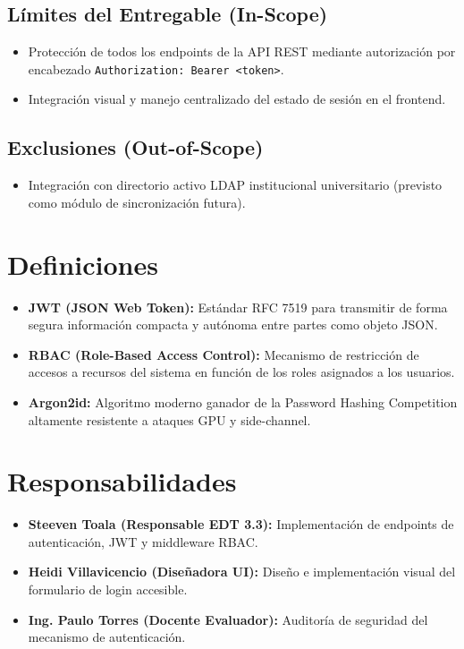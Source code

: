 \documentclass[12pt,a4paper]{article}
\begin{document}
\subsection{Límites del Entregable (In-Scope)}
\begin{itemize}[leftmargin=1.5em, itemsep=2pt]
    \item Protección de todos los endpoints de la API REST mediante autorización por encabezado \texttt{Authorization: Bearer <token>}.
    \item Integración visual y manejo centralizado del estado de sesión en el frontend.
\end{itemize}
\subsection{Exclusiones (Out-of-Scope)}
\begin{itemize}[leftmargin=1.5em, itemsep=2pt]
    \item Integración con directorio activo LDAP institucional universitario (previsto como módulo de sincronización futura).
\end{itemize}

\section{Definiciones}
\begin{itemize}[leftmargin=1.5em, itemsep=2pt]
    \item \textbf{JWT (JSON Web Token):} Estándar RFC 7519 para transmitir de forma segura información compacta y autónoma entre partes como objeto JSON.
    \item \textbf{RBAC (Role-Based Access Control):} Mecanismo de restricción de accesos a recursos del sistema en función de los roles asignados a los usuarios.
    \item \textbf{Argon2id:} Algoritmo moderno ganador de la Password Hashing Competition altamente resistente a ataques GPU y side-channel.
\end{itemize}

\section{Responsabilidades}
\begin{itemize}[leftmargin=1.5em, itemsep=2pt]
    \item \textbf{Steeven Toala (Responsable EDT 3.3):} Implementación de endpoints de autenticación, JWT y middleware RBAC.
    \item \textbf{Heidi Villavicencio (Diseñadora UI):} Diseño e implementación visual del formulario de login accesible.
    \item \textbf{Ing. Paulo Torres (Docente Evaluador):} Auditoría de seguridad del mecanismo de autenticación.
\end{itemize}
\end{document}
